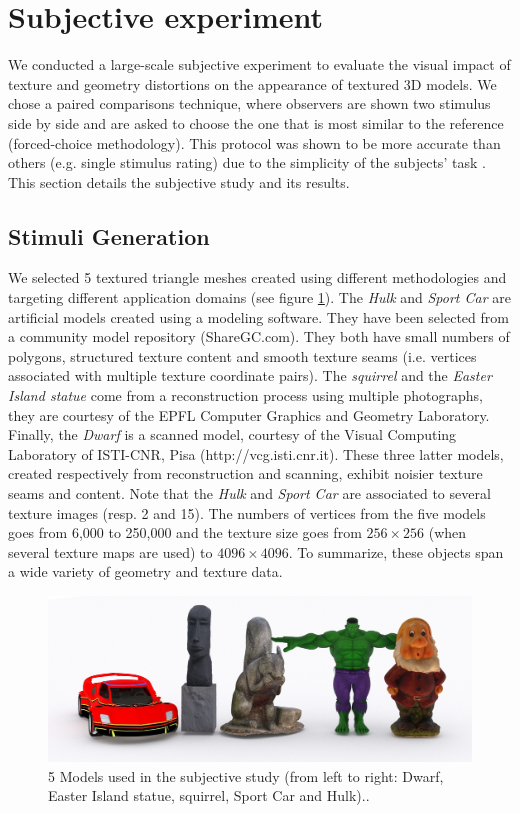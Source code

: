\section{Subjective experiment}
We conducted a large-scale subjective experiment to evaluate the visual impact of texture and geometry distortions on the appearance of textured 3D models. We chose a paired comparisons technique, where observers are shown two stimulus side by side and are asked to choose the one that is most similar to the reference (forced-choice methodology). This protocol was shown to be more accurate than others (e.g. single stimulus rating) due to the simplicity of the subjects’ task \cite{Mantiuk2012}. This section details the subjective study and its results.

\subsection{Stimuli Generation}
We selected 5 textured triangle meshes created using different methodologies and targeting different application domains (see figure \ref{fig-ref}). The \textit{Hulk} and \textit{Sport Car} are artificial models created using a modeling software. They have been selected from a community model repository (ShareGC.com). They both have small numbers of polygons, structured texture content and smooth texture seams (i.e. vertices associated with multiple texture coordinate pairs). The \textit{squirrel} and the \textit{Easter Island statue} come from a reconstruction process using multiple photographs, they are courtesy of the EPFL Computer Graphics and Geometry Laboratory. Finally, the \textit{Dwarf} is a scanned model, courtesy of the Visual Computing Laboratory of ISTI-CNR, Pisa (http://vcg.isti.cnr.it). These three latter models, created respectively from reconstruction and scanning, exhibit noisier texture seams and content. Note that the \textit{Hulk} and \textit{Sport Car} are associated to several texture images (resp. 2 and 15). The numbers of vertices from the five models goes from 6,000 to 250,000 and the texture size goes from $256\times256$ (when several texture maps are used) to $4096\times4096$.  To summarize, these objects span a wide variety of geometry and texture data.\\
\begin{figure}
  \centering
  \includegraphics[width=.7\linewidth]{allmodels.jpg}
  \caption{\label{fig-ref} 5 Models used in the subjective study (from left to right: Dwarf, Easter Island statue, squirrel, Sport Car and Hulk)..}
  \end{figure}
